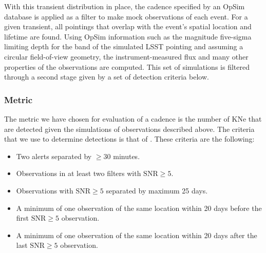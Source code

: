 \begin{table}[h!]
\centering
{}
 \caption{Parameters used to generate the simulated LSST kilonovae observations.}\label{tab: sim_params}
\end{table}

With this transient distribution in place, the cadence specified by an OpSim database is applied as a filter to make mock observations of each event. For a given transient, all pointings that overlap with the event's spatial location and lifetime are found. Using OpSim information such as the magnitude five-sigma limiting depth for the band of the simulated LSST pointing and assuming a circular field-of-view geometry, the instrument-measured flux and many other properties of the observations are computed. This set of simulations is filtered through a second stage given by a set of detection criteria below.

\subsubsection{Metric}
The metric we have chosen for evaluation of a cadence is the number of KNe that are detected given the simulations of observations described above. The criteria that we use to determine detections is that of \citet{Scolnic2017a}. These criteria are the following:
\begin{itemize}
  \item Two alerts separated by $\geq 30$ minutes.
  \item Observations in at least two filters with $\mathrm{SNR} \geq 5$.
  \item Observations with $\mathrm{SNR} \geq 5$ separated by maximum 25 days.
  \item A minimum of one observation of the same location within 20 days before the first $\mathrm{SNR} \geq 5$ observation.
  \item A minimum of one observation of the same location within 20 days after the last $\mathrm{SNR} \geq 5$ observation.
\end{itemize}

